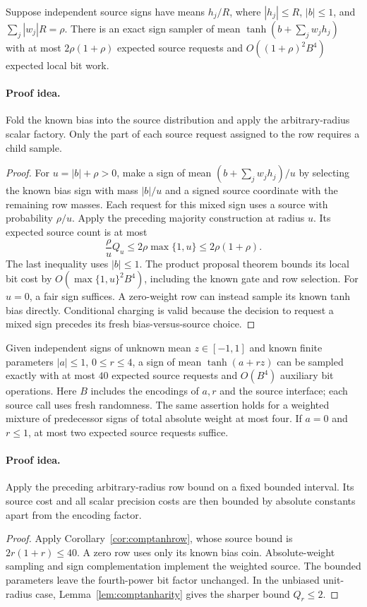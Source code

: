 \begin{corollary}
\label{cor:comptanhrow}
Suppose independent source signs have means $h_j/R$, where $|h_j|\le R$,
$|b|\le1$, and $\sum_j|w_j|R=\rho$. There is an exact sign sampler of
mean $\tanh(b+\sum_jw_jh_j)$ with at most $2\rho(1+\rho)$ expected source
requests and $O((1+\rho)^2B^4)$ expected local bit work.
\end{corollary}
\paragraph{Proof idea.}
Fold the known bias into the source distribution and apply the
arbitrary-radius scalar factory. Only the part of each source request
assigned to the row requires a child sample.

\begin{proof}
For $u=|b|+\rho>0$, make a sign of mean
$(b+\sum_jw_jh_j)/u$ by selecting the known bias sign with mass $|b|/u$
and a signed source coordinate with the remaining row masses. Each
request for this mixed sign uses a source with probability $\rho/u$.
Apply the preceding majority construction at radius $u$. Its expected
source count is at most
\[
 \frac\rho u Q_u\le2\rho\max\{1,u\}\le2\rho(1+\rho).
\]
The last inequality uses $|b|\le1$. The product proposal theorem bounds
its local bit cost by $O(\max\{1,u\}^2B^4)$, including the known gate
and row selection. For $u=0$, a fair sign suffices. A zero-weight row
can instead sample its known tanh bias directly. Conditional charging
is valid because the decision to request a mixed sign precedes its
fresh bias-versus-source choice.
\end{proof}


\begin{corollary}\label{lem:unittanhfour}
Given independent signs of unknown mean $z\in[-1,1]$ and known
finite parameters $|a|\le1$, $0\le r\le4$, a sign of mean
$\tanh(a+rz)$ can be sampled exactly with at most $40$ expected
source requests and $O(B^4)$ auxiliary bit operations. Here $B$
includes the encodings of $a,r$ and the source interface; each
source call uses fresh randomness. The same assertion holds for
a weighted mixture of predecessor signs of total absolute weight
at most four. If $a=0$ and $r\le1$, at most two expected
source requests suffice.
\end{corollary}
\paragraph{Proof idea.}
Apply the preceding arbitrary-radius row bound on a fixed bounded interval.
Its source cost and all scalar precision costs are then bounded by absolute
constants apart from the encoding factor.

\begin{proof}
Apply Corollary~\ref{cor:comptanhrow}, whose source bound is
$2r(1+r)\le40$. A zero row uses only its known bias coin.
Absolute-weight sampling and sign complementation implement the
weighted source. The bounded parameters leave the fourth-power
bit factor unchanged. In the unbiased unit-radius case,
Lemma~\ref{lem:comptanharity} gives the sharper bound $Q_r\le2$.
\end{proof}

